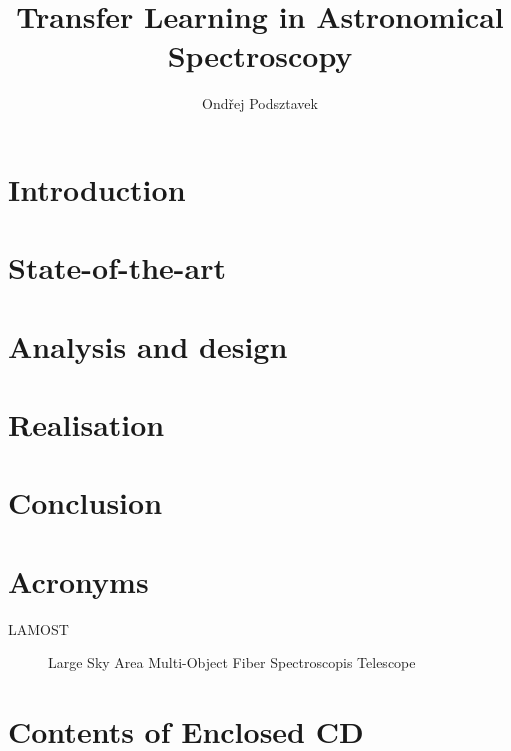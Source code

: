 \documentclass[thesis=M,english]{FITthesis}[2012/10/20]
\title{Transfer Learning in Astronomical Spectroscopy}
\author{Ondřej Podsztavek}
\begin{document}
\chapter{Introduction}

\chapter{State-of-the-art}
\cite{goodfellow2016}

\chapter{Analysis and design}

\chapter{Realisation}

\chapter{Conclusion}




\appendix

\chapter{Acronyms}
\begin{description}
    \item[LAMOST] Large Sky Area Multi-Object Fiber Spectroscopis Telescope
\end{description}

\chapter{Contents of Enclosed CD}

\begin{figure}
\end{figure}
\end{document}
